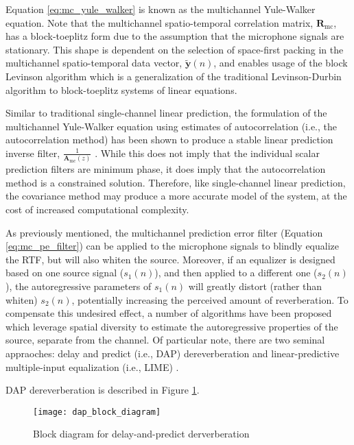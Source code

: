 Equation \ref{eq:mc_yule_walker} is known as the multichannel Yule-Walker equation. Note that the multichannel spatio-temporal correlation matrix, $\boldsymbol{R}_{\mathrm{mc}}$, has a block-toeplitz form due to the assumption that the microphone signals are stationary. This shape is dependent on the selection of space-first packing in the multichannel spatio-temporal data vector, $\boldsymbol{\tilde{y}}(n)$, and enables usage of the block Levinson algorithm \citep[i.e., the multichannel Levinson algorithm, ][]{whittle1963fitting} which is a generalization of the traditional Levinson-Durbin algorithm to block-toeplitz systems of linear equations.

Similar to traditional single-channel linear prediction, the formulation of the multichannel Yule-Walker equation using estimates of autocorrelation (i.e., the autocorrelation method) has been shown to produce a stable linear prediction inverse filter, $\frac{1}{\boldsymbol{A}_{\mathrm{mc}}(z)}$ \citep{inouye1983modeling}. While this does not imply that the individual scalar prediction filters are minimum phase, it does imply that the autocorrelation method is a constrained solution. Therefore, like single-channel linear prediction, the covariance method may produce a more accurate model of the system, at the cost of increased computational complexity.

As previously mentioned, the multichannel prediction error filter (Equation \ref{eq:mc_pe_filter}) can be applied to the microphone signals to blindly equalize the RTF, but will also whiten the source. Moreover, if an equalizer is designed based on one source signal ($s_1(n)$), and then applied to a different one ($s_2(n)$), the autoregressive parameters of $s_1(n)$  will greatly distort (rather than whiten) $s_2(n)$, potentially increasing the perceived amount of reverberation. To compensate this undesired effect, a number of algorithms have been proposed which leverage spatial diversity to estimate the autoregressive properties of the source, separate from the channel.  Of particular note, there are two seminal appraoches: delay and predict (i.e., DAP) dereverberation \citep{triki2006delay} and linear-predictive multiple-input equalization (i.e., LIME) \citep{delcroix2007precise}.

DAP dereverberation is described in Figure \ref{fig:dap_block_diagram}. 

\begin{figure}[H]
	\texttt{[image: dap\_block\_diagram]}
	\centering
	\caption{Block diagram for delay-and-predict derverberation \citep{triki2006delay}}
	\label{fig:dap_block_diagram}
\end{figure}


